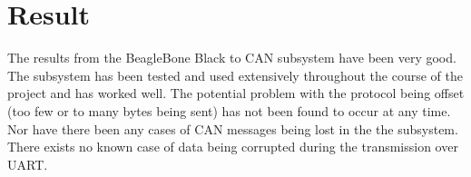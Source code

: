 
\section{Result}\label{sec:result}
The results from the BeagleBone Black to CAN subsystem have been very good. The subsystem has been tested and used extensively throughout the course of the project and has worked well. \newline
The potential problem with the protocol being offset (too few or to many bytes being sent) has not been found to occur at any time. Nor have there been any cases of CAN messages being lost in the the subsystem. \newline
There exists no known case of data being corrupted during the transmission over UART.
